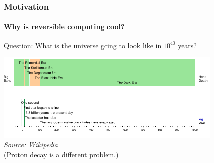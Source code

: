 \documentclass{beamer}
\begin{document}
\addtocounter{page}{1}
\begin{frame}
\addtocounter{page}{-1}
\frametitle{Motivation}
\framesubtitle{\hspace{5mm}Why is reversible computing cool?} 

\begin{block}{Question:}
What is the universe going to look like in $10^{40}$ years?
\end{block}


\pause
\begin{center}
\vspace{-0.5cm}
\includegraphics[width=11cm]{universe_timeline.png}%
\\
\textit{\footnotesize{Source: Wikipedia}}
\\
\footnotesize{(Proton decay is a different problem.)}
\end{center}

\end{frame}
\end{document}
